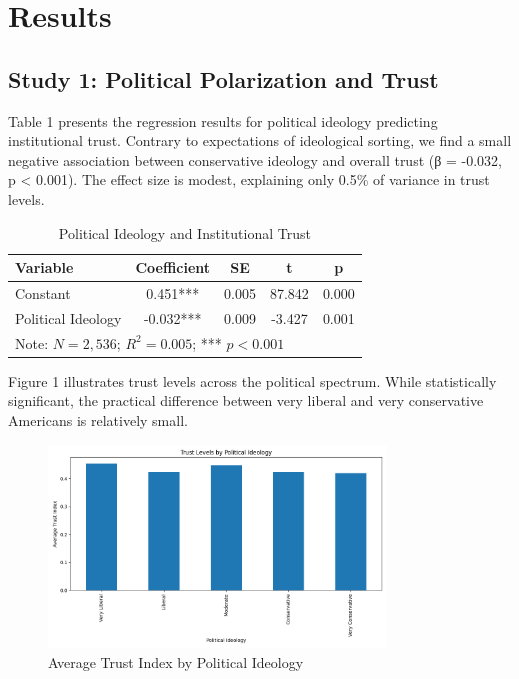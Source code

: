 \documentclass[12pt,a4paper]{article}
\begin{document}
\section{Results}

\subsection{Study 1: Political Polarization and Trust}

Table 1 presents the regression results for political ideology predicting 
institutional trust. Contrary to expectations of ideological sorting, we find a 
small negative association between conservative ideology and overall trust 
(β = -0.032, p < 0.001). The effect size is modest, explaining only 0.5\% of 
variance in trust levels.

\begin{table}[h]
\centering
\caption{Political Ideology and Institutional Trust}
\begin{tabular}{lcccc}
\toprule
Variable & Coefficient & SE & t & p \\
\midrule
Constant & 0.451*** & 0.005 & 87.842 & 0.000 \\
Political Ideology & -0.032*** & 0.009 & -3.427 & 0.001 \\
\bottomrule
\multicolumn{5}{l}{\footnotesize Note: $N = 2,536$; $R^2 = 0.005$; *** $p < 0.001$}
\end{tabular}
\end{table}

Figure 1 illustrates trust levels across the political spectrum. While statistically 
significant, the practical difference between very liberal and very conservative 
Americans is relatively small.

\begin{figure}[h]
\centering
\includegraphics[width=0.8\textwidth]{research1_trust_by_ideology.png}
\caption{Average Trust Index by Political Ideology}
\end{figure}
\end{document}
